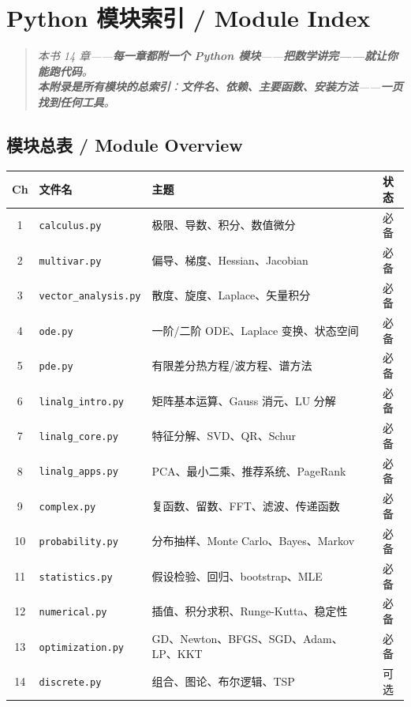 
\chapter{Python 模块索引 / Module Index}
\label{app:modules}

\begin{quote}\itshape
本书 14 章——\textbf{每一章都附\textbf{一个 Python 模块}}——\textbf{把数学讲完——就让你能跑代码}。\\
\textbf{本附录是\textbf{所有模块的总索引}}：\textbf{文件名、依赖、主要函数、安装方法}——\textbf{一页找到任何工具}。
\end{quote}

\section{模块总表 / Module Overview}

\begin{center}
\renewcommand{\arraystretch}{1.25}
\begin{tabular}{@{}cllc@{}}
\toprule
\textbf{Ch} & \textbf{文件名} & \textbf{主题} & \textbf{状态} \\
\midrule
1  & \texttt{calculus.py}      & 极限、导数、积分、数值微分             & 必备 \\
2  & \texttt{multivar.py}      & 偏导、梯度、Hessian、Jacobian        & 必备 \\
3  & \texttt{vector\_analysis.py} & 散度、旋度、Laplace、矢量积分        & 必备 \\
4  & \texttt{ode.py}           & 一阶/二阶 ODE、Laplace 变换、状态空间   & 必备 \\
5  & \texttt{pde.py}           & 有限差分热方程/波方程、谱方法           & 必备 \\
6  & \texttt{linalg\_intro.py} & 矩阵基本运算、Gauss 消元、LU 分解         & 必备 \\
7  & \texttt{linalg\_core.py}  & 特征分解、SVD、QR、Schur                 & 必备 \\
8  & \texttt{linalg\_apps.py}  & PCA、最小二乘、推荐系统、PageRank        & 必备 \\
9  & \texttt{complex.py}       & 复函数、留数、FFT、滤波、传递函数        & 必备 \\
10 & \texttt{probability.py}   & 分布抽样、Monte Carlo、Bayes、Markov     & 必备 \\
11 & \texttt{statistics.py}    & 假设检验、回归、bootstrap、MLE           & 必备 \\
12 & \texttt{numerical.py}     & 插值、积分求积、Runge-Kutta、稳定性      & 必备 \\
13 & \texttt{optimization.py}  & GD、Newton、BFGS、SGD、Adam、LP、KKT      & 必备 \\
14 & \texttt{discrete.py}      & 组合、图论、布尔逻辑、TSP                  & 可选 \\
\bottomrule
\end{tabular}
\end{center}

